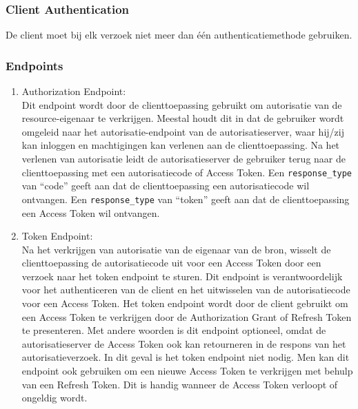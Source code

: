 \subsubsection{Client Authentication}
\label{subsubsec:client-authentication}
De client moet bij elk verzoek niet meer dan één authenticatiemethode gebruiken.

\subsubsection{Endpoints}%
\label{subsubsec:endpoints}
\begin{enumerate}[label=\textbf{-}]
    \item Authorization Endpoint: \\
    Dit endpoint wordt door de clienttoepassing gebruikt om autorisatie van de resource-eigenaar te verkrijgen. Meestal houdt dit in dat de gebruiker wordt omgeleid naar het autorisatie-endpoint van de autorisatieserver, waar hij/zij kan inloggen en machtigingen kan verlenen aan de clienttoepassing. Na het verlenen van autorisatie leidt de autorisatieserver de gebruiker terug naar de clienttoepassing met een autorisatiecode of Access Token.
    \newline
    Een \texttt{response\_type} van ``code'' geeft aan dat de clienttoepassing een autorisatiecode wil ontvangen. Een \texttt{response\_type} van ``token'' geeft aan dat de clienttoepassing een Access Token wil ontvangen.
  
    \item Token Endpoint: \\
    Na het verkrijgen van autorisatie van de eigenaar van de bron, wisselt de clienttoepassing de autorisatiecode uit voor een Access Token door een verzoek naar het token endpoint te sturen. Dit endpoint is verantwoordelijk voor het authenticeren van de client en het uitwisselen van de autorisatiecode voor een Access Token. Het token endpoint wordt door de client gebruikt om een Access Token te verkrijgen door de Authorization Grant of Refresh Token te presenteren.
    \newline
    Met andere woorden is dit endpoint optioneel, omdat de autorisatieserver de Access Token ook kan retourneren in de respons van het autorisatieverzoek. In dit geval is het token endpoint niet nodig.
    \newline
    Men kan dit endpoint ook gebruiken om een nieuwe Access Token te verkrijgen met behulp van een Refresh Token. Dit is handig wanneer de Access Token verloopt of ongeldig wordt.
  

\end{enumerate}
